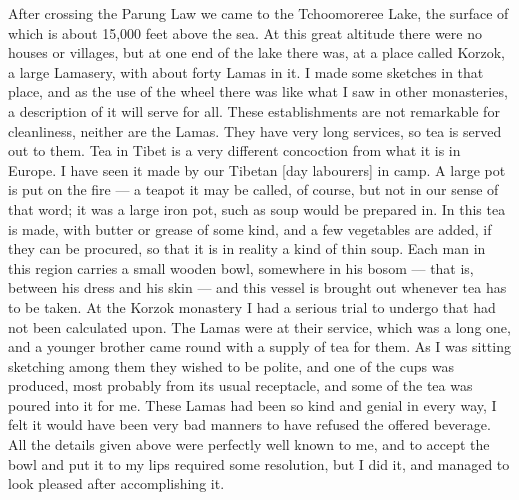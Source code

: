 \documentclass[a4paper, 11pt, oneside, polutonikogreek, english]{article}
\begin{document}
After crossing the Parung Law we came to the Tchoomoreree Lake, the surface of which is about 15,000 feet above the sea. At this great altitude there were no houses or villages, but at one end of the lake there was, at a place called Korzok, a large Lamasery, with about forty Lamas in it. I made some sketches in that place, and as the use of the wheel there was like what I saw in other monasteries, a description of it will serve for all. These establishments are not remarkable for cleanliness, neither are the Lamas. They have very long services, so tea is served out to them. Tea in Tibet is a very different concoction from what it is in Europe. I have seen it made by our Tibetan [day labourers] in camp. A large pot is put on the fire --- a teapot it may be called, of course, but not in our sense of that word; it was a large iron pot, such as soup would be prepared in. In this tea is made, with butter or grease of some kind, and a few vegetables are added, if they can be procured, so that it is in reality a kind of thin soup. Each man in this region carries a small wooden bowl, somewhere in his bosom --- that is, between his dress and his skin --- and this vessel is brought out whenever tea has to be taken. At the Korzok monastery I had a serious trial to undergo that had not been calculated upon. The Lamas were at their service, which was a long one, and a younger brother came round with a supply of tea for them. As I was sitting sketching among them they wished to be polite, and one of the cups was produced, most probably from its usual receptacle, and some of the tea was poured into it for me. These Lamas had been so kind and genial in every way, I felt it would have been very bad manners to have refused the offered beverage. All the details given above were perfectly well known to me, and to accept the bowl and put it to my lips required some resolution, but I did it, and managed to look pleased after accomplishing it.
\end{document}
